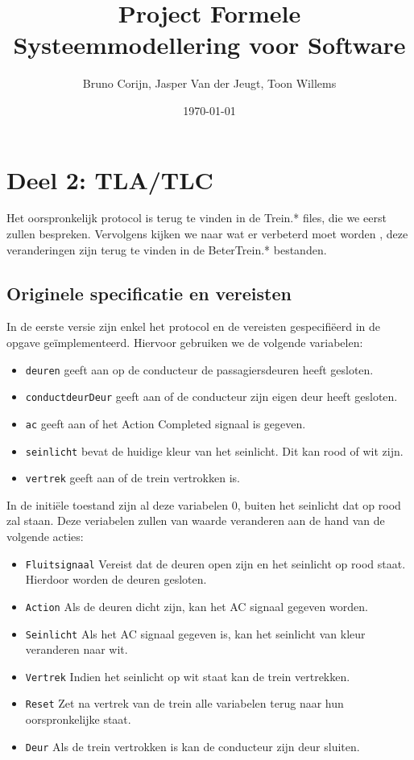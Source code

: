 \documentclass[a4paper,10pt]{article}
\title{Project Formele Systeemmodellering voor Software}
\author{Bruno Corijn, Jasper Van der Jeugt, Toon Willems}
\date{\today}
\begin{document}
\maketitle

\section{Deel 2: TLA/TLC}

Het oorspronkelijk protocol is terug te vinden in de Trein.* files, die we 
eerst zullen bespreken. Vervolgens kijken we naar wat er verbeterd moet worden 
, deze veranderingen zijn terug te vinden in de BeterTrein.* bestanden. 
 
\subsection{Originele specificatie en vereisten}

In de eerste versie zijn enkel het protocol en de vereisten gespecifi\"eerd in de 
opgave ge\"implementeerd. Hiervoor gebruiken we de volgende variabelen:
\begin{itemize}
    \item \texttt{deuren} geeft aan op de conducteur de passagiersdeuren heeft 
    gesloten.
    \item \texttt{conductdeurDeur} geeft aan of de conducteur zijn eigen deur 
    heeft gesloten.
    \item \texttt{ac} geeft aan of het Action Completed signaal is gegeven.
    \item \texttt{seinlicht} bevat de huidige kleur van het seinlicht. Dit kan 
    rood of wit zijn.
    \item \texttt{vertrek} geeft aan of de trein vertrokken is.
\end{itemize}

In de initi\"ele toestand zijn al deze variabelen 0, buiten het seinlicht dat op 
rood zal staan. Deze veriabelen zullen van waarde veranderen aan de hand van de 
volgende acties:
\begin{itemize}
    \item \texttt{Fluitsignaal} Vereist dat de deuren open zijn en het seinlicht 
    op rood staat. Hierdoor worden de deuren gesloten.
    \item \texttt{Action} Als de deuren dicht zijn, kan het AC signaal gegeven 
    worden.
    \item \texttt{Seinlicht} Als het AC signaal gegeven is, kan het seinlicht van
    kleur veranderen naar wit.
    \item \texttt{Vertrek} Indien het seinlicht op wit staat kan de trein 
    vertrekken.
    \item \texttt{Reset} Zet na vertrek van de trein alle variabelen terug naar 
    hun oorspronkelijke staat.
    \item \texttt{Deur} Als de trein vertrokken is kan de conducteur zijn deur 
    sluiten.
\end{itemize}
\end{document}
